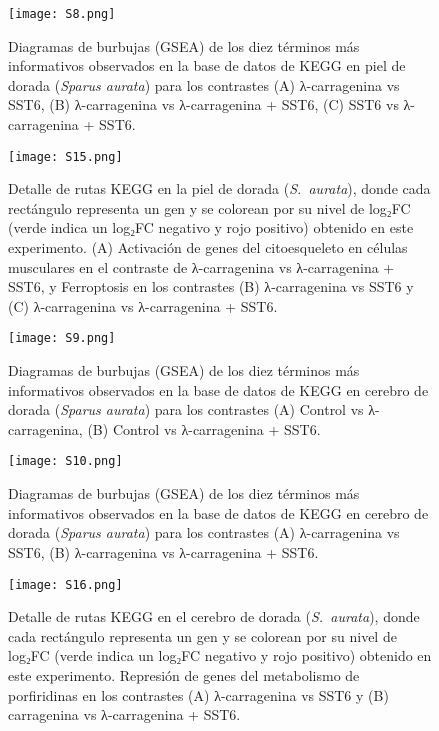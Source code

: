 \documentclass[10pt,a4paper]{article}
\begin{document}
\begin{figure}[ht]
  \centering
  \texttt{[image: S8.png]}%
  \caption[Diagramas GSEA]{%
	Diagramas de burbujas (GSEA) de los diez términos más informativos observados en la base de datos de KEGG en piel de dorada (\textit{Sparus aurata}) para los contrastes (A) λ-carragenina vs SST6, (B) λ-carragenina vs λ-carragenina + SST6, (C) SST6 vs λ-carragenina + SST6.
 }
  \label{fig:S8}
\end{figure}

\begin{figure}[ht]
  \centering
  \texttt{[image: S15.png]}%
  \caption[Diagramas GSEA]{%
	Detalle de rutas KEGG en la piel de dorada (\textit{S.\ aurata}), donde cada rectángulo representa un gen y se colorean por su nivel de log₂FC (verde indica un log₂FC negativo y rojo positivo) obtenido en este experimento. (A) Activación de genes del citoesqueleto en células musculares en el contraste de λ-carragenina vs λ-carragenina + SST6, y Ferroptosis en los contrastes (B) λ-carragenina vs SST6 y (C) λ-carragenina vs λ-carragenina + SST6.
 }
  \label{fig:S9}
\end{figure}


\begin{figure}[ht]
  \centering
  \texttt{[image: S9.png]}%
  \caption[Diagramas GSEA]{%
	Diagramas de burbujas (GSEA) de los diez términos más informativos observados en la base de datos de KEGG en cerebro de dorada (\textit{Sparus aurata}) para los contrastes (A) Control vs λ-carragenina, (B) Control vs λ-carragenina + SST6.
 }
  \label{fig:S10}
\end{figure}


\begin{figure}[ht]
  \centering
  \texttt{[image: S10.png]}%
  \caption[Diagramas GSEA]{%
	Diagramas de burbujas (GSEA) de los diez términos más informativos observados en la base de datos de KEGG en cerebro de dorada (\textit{Sparus aurata}) para los contrastes (A) λ-carragenina vs SST6, (B) λ-carragenina vs λ-carragenina + SST6.
 }
  \label{fig:S11}
\end{figure}


\begin{figure}[ht]
  \centering
  \texttt{[image: S16.png]}%
  \caption[Diagramas GSEA]{%
	Detalle de rutas KEGG en el cerebro de dorada (\textit{S.\ aurata}), donde cada rectángulo representa un gen y se colorean por su nivel de log₂FC (verde indica un log₂FC negativo y rojo positivo) obtenido en este experimento. Represión de genes del metabolismo de porfiridinas en los contrastes (A) λ-carragenina vs SST6 y (B) carragenina vs λ-carragenina + SST6.
 }

  \label{fig:S12}
\end{figure}
\end{document}
